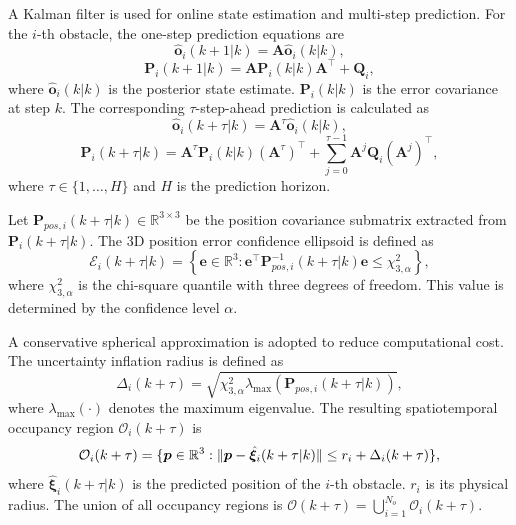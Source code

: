 \documentclass[lettersize,journal]{IEEEtran}
\newcommand{\vect}[1]{\boldsymbol{#1}}
\newcommand{\R}{\mathbb{R}}
\begin{document}
A Kalman filter is used for online state estimation and multi-step prediction. For the $i$-th obstacle, the one-step prediction equations are
\begin{equation}
	\hat{\vect{o}}_i(k+1|k) = \vect{A}\hat{\vect{o}}_i(k|k),
\end{equation}
\begin{equation}
	\vect{P}_i(k+1|k) = \vect{A}\vect{P}_i(k|k)\vect{A}^{\top} + \vect{Q}_i,
\end{equation}
where $\hat{\vect{o}}_i(k|k)$ is the posterior state estimate. $\vect{P}_i(k|k)$ is the error covariance at step $k$. The corresponding $\tau$-step-ahead prediction is calculated as
\begin{equation}
	\hat{\vect{o}}_i(k+\tau|k) = \vect{A}^{\tau}\hat{\vect{o}}_i(k|k),
\end{equation}
\begin{equation}
	\vect{P}_i(k+\tau|k) = \vect{A}^{\tau}\vect{P}_i(k|k)(\vect{A}^{\tau})^{\top}
	+ \sum_{j=0}^{\tau-1}\vect{A}^{j}\vect{Q}_i(\vect{A}^{j})^{\top},
\end{equation}
where $\tau \in \{1, \ldots, H\}$ and $H$ is the prediction horizon.

Let $\vect{P}_{pos,i}(k+\tau|k) \in \R^{3\times 3}$ be the position covariance submatrix extracted from $\vect{P}_i(k+\tau|k)$. The 3D position error confidence ellipsoid is defined as
\begin{equation}
	\mathcal{E}_i(k+\tau|k) = \left\{ \vect{e} \in \R^3 : \vect{e}^{\top}\vect{P}_{pos,i}^{-1}(k+\tau|k)\vect{e} \le \chi_{3,\alpha}^{2} \right\}, \label{eq:error_ellipsoid}
\end{equation}
where $\chi_{3,\alpha}^{2}$ is the chi-square quantile with three degrees of freedom. This value is determined by the confidence level $\alpha$. 

A conservative spherical approximation is adopted to reduce computational cost. The uncertainty inflation radius \cite{ref5} is defined as
\begin{equation}
	\Delta_i(k+\tau) = \sqrt{\chi_{3,\alpha}^{2} \lambda_{\max}(\vect{P}_{pos,i}(k+\tau|k))}, 
\end{equation}
where $\lambda_{\max}(\cdot)$ denotes the maximum eigenvalue. The resulting spatiotemporal occupancy region $\mathcal{O}_i(k+\tau)$ \cite{ref5} is
\begin{equation}
	\small
	\mathcal{O}_i(k+\tau) = \{ \vect{p} \in \R^{3} : \|\vect{p} - \hat{\vect{\xi}}_i(k+\tau|k)\| \le r_i + \Delta_i(k+\tau) \}, 
\end{equation}
where $\hat{\vect{\xi}}_i(k+\tau|k)$ is the predicted position of the $i$-th obstacle. $r_i$ is its physical radius. The union of all occupancy regions is $\mathcal{O}(k+\tau) = \bigcup_{i=1}^{N_o} \mathcal{O}_i(k+\tau)$.
\end{document}
